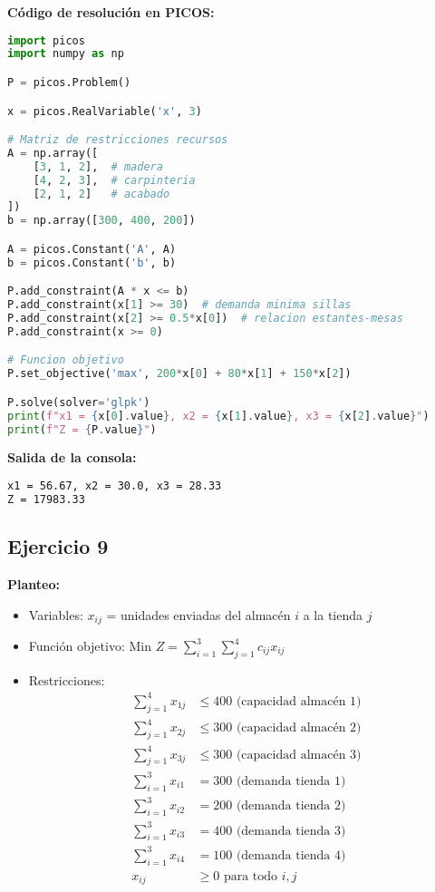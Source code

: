 \documentclass[12pt]{article}
\begin{document}
\textbf{Código de resolución en PICOS:}
\begin{lstlisting}[language=Python]
import picos
import numpy as np

P = picos.Problem()

x = picos.RealVariable('x', 3)

# Matriz de restricciones recursos
A = np.array([
    [3, 1, 2],  # madera
    [4, 2, 3],  # carpinteria
    [2, 1, 2]   # acabado
])
b = np.array([300, 400, 200])

A = picos.Constant('A', A)
b = picos.Constant('b', b)

P.add_constraint(A * x <= b)
P.add_constraint(x[1] >= 30)  # demanda minima sillas
P.add_constraint(x[2] >= 0.5*x[0])  # relacion estantes-mesas
P.add_constraint(x >= 0)

# Funcion objetivo
P.set_objective('max', 200*x[0] + 80*x[1] + 150*x[2])

P.solve(solver='glpk')
print(f"x1 = {x[0].value}, x2 = {x[1].value}, x3 = {x[2].value}")
print(f"Z = {P.value}")
\end{lstlisting}

\textbf{Salida de la consola:}
\begin{lstlisting}[language=bash,backgroundcolor=\color{black},basicstyle=\color{white}\ttfamily,numbers=none]
x1 = 56.67, x2 = 30.0, x3 = 28.33
Z = 17983.33
\end{lstlisting}

\subsection{Ejercicio 9}

\textbf{Planteo:}
\begin{itemize}
\item Variables: $x_{ij}$ = unidades enviadas del almacén $i$ a la tienda $j$
\item Función objetivo: Min $Z = \sum_{i=1}^3 \sum_{j=1}^4 c_{ij}x_{ij}$
\item Restricciones:
  \begin{align*}
  \sum_{j=1}^4 x_{1j} &\leq 400 \text{ (capacidad almacén 1)} \\
  \sum_{j=1}^4 x_{2j} &\leq 300 \text{ (capacidad almacén 2)} \\
  \sum_{j=1}^4 x_{3j} &\leq 300 \text{ (capacidad almacén 3)} \\
  \sum_{i=1}^3 x_{i1} &= 300 \text{ (demanda tienda 1)} \\
  \sum_{i=1}^3 x_{i2} &= 200 \text{ (demanda tienda 2)} \\
  \sum_{i=1}^3 x_{i3} &= 400 \text{ (demanda tienda 3)} \\
  \sum_{i=1}^3 x_{i4} &= 100 \text{ (demanda tienda 4)} \\
  x_{ij} &\geq 0 \text{ para todo } i,j
  \end{align*}
\end{itemize}
\end{document}
